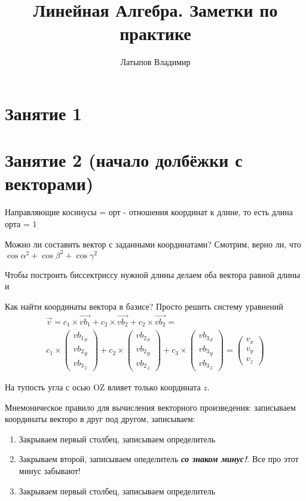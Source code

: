 \documentclass[12pt, a4paper]{article}
\title{Линейная Алгебра. Заметки по практике}
\author{Латыпов Владимир}
\begin{document}

    \section{Занятие 1} 

    \section{Занятие 2 (начало долбёжки с векторами)}
    Направляющие косинусы = орт - отношения координат к длине, то есть длина орта = 1

    Можно ли составить вектор с заданными координатами? Смотрим, верно ли, что 
    $\cos{\alpha}^2 + \cos{\beta}^2 + \cos{\gamma}^2$

    Чтобы построить биссектриссу нужной длины делаем оба вектора равной длины и 


    Как найти координаты вектора в базисе? Просто решить систему уравнений 
    \begin{multline}
            \vec{v} = c_1 \times \vec{vb_1} + c_2 \times \vec{vb_2} + c_2 \times \vec{vb_2} = \\
            c_1 \times \begin{pmatrix}
                {vb_1}_{x}\\
                {vb_2}_{y} \\
                {vb_3}_{z}
        \end{pmatrix} + 
        c_2 \times \begin{pmatrix}
            {vb_2}_{x}\\
            {vb_2}_{y} \\
            {vb_2}_{z}
        \end{pmatrix}
        + c_3 \times \begin{pmatrix}
        {vb_3}_{x}\\
        {vb_3}_{y} \\
        {vb_3}_{z}
        \end{pmatrix} = \begin{pmatrix}
            {v}_{x}\\
            {v}_{y} \\
            {v}_{z}
            \end{pmatrix}
    \end{multline}

    На тупость угла с осью OZ влияет только координата $z$.

    Мнемоническое правило для вычисления векторного произведения: 
    записываем координаты векторо в друг под другом, записываем:
    \begin{enumerate}
        \item Закрываем первый столбец, записываем определитель
        \item Закрываем второй, записываем опеделитель \textit{\textbf{со знаком минус!}}. Все про этот минус забывают!
        \item Закрываем первый столбец, записываем определитель
    \end{enumerate}
\end{document}
